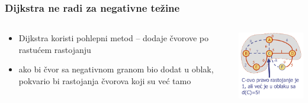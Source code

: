\documentclass[compress]{beamer}
\begin{document}
\begin{frame}[fragile]
  \frametitle{Dijkstra ne radi za negativne težine}
  \begin{columns}
    \begin{column}[t]{7cm}
      \begin{itemize}
        \item Dijkstra koristi pohlepni metod -- dodaje čvorove po 
          rastućem rastojanju
        \item ako bi čvor sa negativnom granom bio dodat u oblak,
          pokvario bi rastojanja čvorova koji su već tamo
      \end{itemize}
    \end{column}
    \begin{column}[t]{5cm}
      \begin{center}
        \includegraphics[width=5cm]{asp-14-pic65.png}
      \end{center}
    \end{column}
  \end{columns}
\end{frame}
\end{document}
